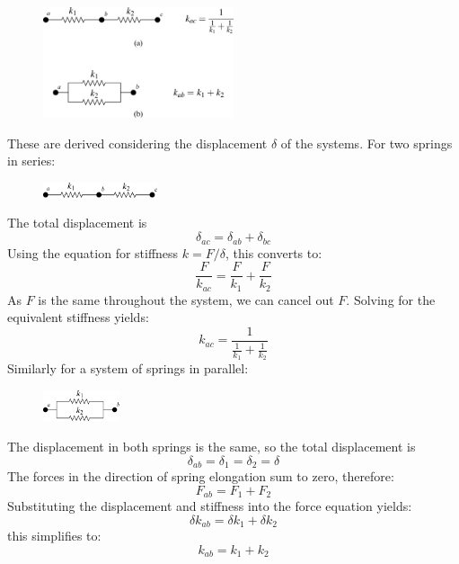 \documentclass[12pt,a4paper]{article}
\begin{document}
			\begin{figure}[H]
				\centering
				\includegraphics[width=0.5\textwidth]{../../Figures/equivalent_stiffness.png}
			\end{figure}	
			These are derived considering the displacement $\delta$ of the systems. For two springs in series:
			\begin{figure}[H]
				\centering
				\includegraphics[width=0.3\textwidth]{../../Figures/equivalent_stiffness_series.png}
			\end{figure}			
			The total displacement is 
			\begin{equation}
				\delta_{ac} = \delta_{ab} + \delta_{bc}
			\end{equation}
			Using the equation for stiffness $k=F/\delta$, this converts to:
			\begin{equation}
				\frac{F}{k_{ac}} = \frac{F}{k_{1}} + \frac{F}{k_{2}}
			\end{equation}
			As $F$ is the same throughout the system, we can cancel out $F$. Solving for the equivalent stiffness yields:
			\begin{equation}
				k_{ac} = \frac{1}{\frac{1}{k_1}+\frac{1}{k_2}}
			\end{equation}
			Similarly for a system of springs in parallel:
			\begin{figure}[H]
				\centering
				\includegraphics[width=0.2\textwidth]{../../Figures/equivalent_stiffness_parallel.png}
			\end{figure}			
			The displacement in both springs is the same, so the total displacement is 
			\begin{equation}
				\delta_{ab} = \delta_{\text{1}} =  \delta_{\text{2}} = \delta
			\end{equation}
			The forces in the direction of spring elongation sum to zero, therefore:
			\begin{equation}
				F_{ab} = F_{\text{1}} +  F_{\text{2}}
			\end{equation}			
			Substituting the displacement and stiffness into the force equation yields:
			\begin{equation}
				\delta k_{ab} = 	\delta k_{1} +  \delta k_{2}
			\end{equation}				
			this simplifies to:
			\begin{equation}
				k_{ab} = k_1+k_2
			\end{equation}
\end{document}
